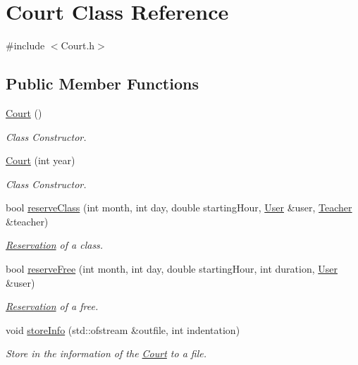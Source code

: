 \hypertarget{class_court}{}\section{Court Class Reference}
\label{class_court}


{\ttfamily \#include $<$Court.\+h$>$}

\subsection*{Public Member Functions}
\begin{DoxyCompactItemize}
\item 
\mbox{\hyperlink{class_court_a786e4db0ebf50a5aec5bfe0cca58b06a}{Court}} ()
\begin{DoxyCompactList}\small\item\em Class Constructor. \end{DoxyCompactList}\item 
\mbox{\hyperlink{class_court_a594463e426e762163a09290e48d1d437}{Court}} (int year)
\begin{DoxyCompactList}\small\item\em Class Constructor. \end{DoxyCompactList}\item 
bool \mbox{\hyperlink{class_court_afaab22238eff25ec1031017d57a1c008}{reserve\+Class}} (int month, int day, double starting\+Hour, \mbox{\hyperlink{class_user}{User}} \&user, \mbox{\hyperlink{class_teacher}{Teacher}} \&teacher)
\begin{DoxyCompactList}\small\item\em \mbox{\hyperlink{class_reservation}{Reservation}} of a class. \end{DoxyCompactList}\item 
bool \mbox{\hyperlink{class_court_a7391435bb499b0ba82600fef187a6fcd}{reserve\+Free}} (int month, int day, double starting\+Hour, int duration, \mbox{\hyperlink{class_user}{User}} \&user)
\begin{DoxyCompactList}\small\item\em \mbox{\hyperlink{class_reservation}{Reservation}} of a free. \end{DoxyCompactList}\item 
void \mbox{\hyperlink{class_court_a25104f6ccd6fea2d3a33798f2e30451e}{store\+Info}} (std\+::ofstream \&outfile, int indentation)
\begin{DoxyCompactList}\small\item\em Store in the information of the \mbox{\hyperlink{class_court}{Court}} to a file. \end{DoxyCompactList}\item 

\end{DoxyCompactItemize}
